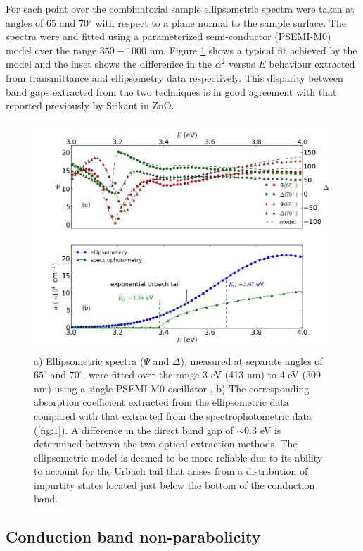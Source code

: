 \documentclass[final,5p,times]{elsarticle}
\begin{document}
For each point over the combinatorial sample ellipsometric spectra were taken at angles of 65 and 70$^{\circ}$ with respect to a plane normal to the sample surface. The spectra were and fitted using a parameterized semi-conductor (PSEMI-M0) model \cite{Paulson1998} over the range $350 - 1000$ nm. Figure \ref{fig:2} shows a typical fit achieved by the model and the inset shows the differenice in the $\alpha^2$ versus $E$ behaviour extracted from transmittance and ellipsometry data respectively. This disparity between band gaps extracted from the two techniques is in good agreement with that reported previously by Srikant \cite{Srikant1998} in ZnO.
\begin{figure}[th!]
\centering
\includegraphics[width = 1.0\columnwidth]{figure_0.png}
\caption{\label{fig:2} a) Ellipsometric spectra ($\Psi$ and $\Delta$), measured at separate angles of $65^{\circ}$ and $70^{\circ}$, were fitted over the range 3 eV (413 nm) to 4 eV (309 nm) using a single PSEMI-M0 oscillator \cite{Paulson1998, Johs1999}, b) The corresponding absorption coefficient extracted from the ellipsometric data compared with that extracted from the spectrophotometric data (\ref{fig:1}). A difference in the direct band gap of $\sim0.3$ eV is determined between the two optical extraction methods. The ellipsometric model is deemed to be more reliable due to its ability to account for the Urbach tail that arises from a distribution of impurtity states located just below the bottom of the conduction band.}
\end{figure}
\subsection{ Conduction band non-parabolicity}
\label{sec:2.2}
\end{document}
